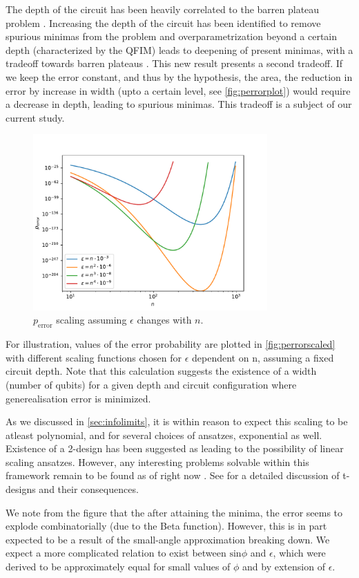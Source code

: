 The depth of the circuit has been heavily correlated to the barren plateau
problem \cite{larocca2021theory}. Increasing the depth of the circuit has been
identified to remove spurious minimas from the problem and overparametrization
beyond a certain depth (characterized by the QFIM) leads to deepening of present
minimas, with a tradeoff towards barren plateaus \cite{larocca2021diagnosing}.
This new result presents a second tradeoff. If we keep the error constant, and
thus by the hypothesis, the area, the reduction in error by increase in width
(upto a certain level, see \autoref{fig:perrorplot}) would require a decrease in
depth, leading to spurious minimas. This tradeoff is a subject of our current
study.

\begin{figure}[ht]
    \centering
    \includegraphics[width=0.8\textwidth]{figures/perrorscaled.pdf}
    \caption{\(p_{\text{error}}\) scaling assuming \(\epsilon\) changes with \(n\).}
    \label{fig:perrorscaled}
\end{figure}

For illustration, values of the error probability are plotted in
\autoref{fig:perrorscaled} with different scaling functions chosen for
\(\epsilon\) dependent on n, assuming a fixed circuit depth. Note that this
calculation suggests the existence of a width (number of qubits) for a given
depth and circuit configuration where generealisation error is minimized.

As we discussed in \autoref{sec:infolimits}, it is within reason to expect this
scaling to be atleast polynomial, and for several choices of ansatzes,
exponential as well. Existence of a 2-design has been suggested as leading to
the possibility of linear scaling ansatzes. However, any interesting problems
solvable within this framework remain to be found as of right now
\cite{larocca2021theory}. See \cite{holmes2021connecting} for a detailed
discussion of t-designs and their consequences.

We note from the figure that the after attaining the minima, the error seems to
explode combinatorially (due to the Beta function). However, this is in part
expected to be a result of the small-angle approximation breaking down. We
expect a more complicated relation to exist between \(\text{sin}\phi\) and
\(\epsilon\), which were derived to be approximately equal for small values of
\(\phi\) and by extension of \(\epsilon\). 
